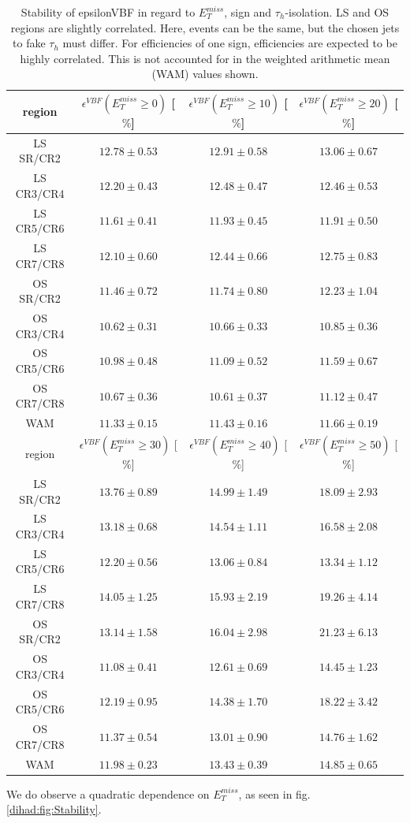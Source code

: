 \begin{table}[!h]
	\centering
	\begin{tabular}{|c||c|c|c|}
		\hline
		region     & $\epsilon^{VBF}(E_{T}^{miss}\geq0)$ [$\%$]& $\epsilon^{VBF}(E_{T}^{miss}\geq10)$ [$\%$]& $\epsilon^{VBF}(E_{T}^{miss}\geq20)$ [$\%$]\\ \hline \hline
		LS SR/CR2  & $12.78\pm0.53$ & $12.91\pm0.58$ & $13.06\pm0.67$ \\ \hline
		LS CR3/CR4 & $12.20\pm0.43$ & $12.48\pm0.47$ & $12.46\pm0.53$ \\ \hline
		LS CR5/CR6 & $11.61\pm0.41$ & $11.93\pm0.45$ & $11.91\pm0.50$ \\ \hline
		LS CR7/CR8 & $12.10\pm0.60$ & $12.44\pm0.66$ & $12.75\pm0.83$ \\ \hline \hline
		OS SR/CR2  & $11.46\pm0.72$ & $11.74\pm0.80$ & $12.23\pm1.04$ \\ \hline
		OS CR3/CR4 & $10.62\pm0.31$ & $10.66\pm0.33$ & $10.85\pm0.36$ \\ \hline
		OS CR5/CR6 & $10.98\pm0.48$ & $11.09\pm0.52$ & $11.59\pm0.67$ \\ \hline
		OS CR7/CR8 & $10.67\pm0.36$ & $10.61\pm0.37$ & $11.12\pm0.47$ \\ \hline \hline
		WAM        & $11.33\pm0.15$ & $11.43\pm0.16$ & $11.66\pm0.19$ \\ \hline
		\hline
		\hline
		region     & $\epsilon^{VBF}(E_{T}^{miss}\geq30)$ [$\%$]& $\epsilon^{VBF}(E_{T}^{miss}\geq40)$ [$\%$]& $\epsilon^{VBF}(E_{T}^{miss}\geq50)$ [$\%$]\\ \hline \hline
		LS SR/CR2  & $13.76\pm0.89$ & $14.99\pm1.49$ & $18.09\pm2.93$ \\ \hline
		LS CR3/CR4 & $13.18\pm0.68$ & $14.54\pm1.11$ & $16.58\pm2.08$ \\ \hline
		LS CR5/CR6 & $12.20\pm0.56$ & $13.06\pm0.84$ & $13.34\pm1.12$ \\ \hline
		LS CR7/CR8 & $14.05\pm1.25$ & $15.93\pm2.19$ & $19.26\pm4.14$ \\ \hline \hline
		OS SR/CR2  & $13.14\pm1.58$ & $16.04\pm2.98$ & $21.23\pm6.13$ \\ \hline
		OS CR3/CR4 & $11.08\pm0.41$ & $12.61\pm0.69$ & $14.45\pm1.23$ \\ \hline
		OS CR5/CR6 & $12.19\pm0.95$ & $14.38\pm1.70$ & $18.22\pm3.42$ \\ \hline
		OS CR7/CR8 & $11.37\pm0.54$ & $13.01\pm0.90$ & $14.76\pm1.62$ \\ \hline \hline
		WAM        & $11.98\pm0.23$ & $13.43\pm0.39$ & $14.85\pm0.65$ \\ \hline
	\end{tabular}
	\caption{Stability of epsilonVBF in regard to $E_{T}^{miss}$, sign and $\tau_{h}$-isolation. LS and OS regions are slightly correlated. Here, events can be the same, but the chosen jets to fake $\tau_{h}$ must differ. For efficiencies of one sign, efficiencies are expected to be highly correlated. This is not accounted for in the weighted arithmetic mean (WAM) values shown.}
	\label{dihad:tab:stability}
\end{table}
We do observe a quadratic dependence on $E_{T}^{miss}$, as seen in fig. \ref{dihad:fig:Stability}.

